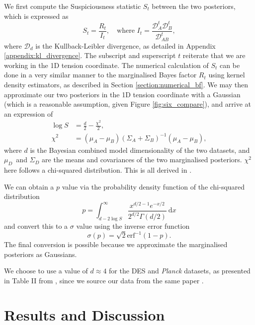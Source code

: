 \documentclass[%
 reprint,
 amsmath,amssymb,
 aps,
]{revtex4-2}
\begin{document}
We first compute the Suspiciousness statistic $S_t$ between the two posteriors, which is expressed as
\begin{equation}
    S_t = \frac{R_t}{I_t}, \quad \textrm{where } I_t = \frac{\mathcal{D}_A^t \mathcal{D}_B^t}{\mathcal{D}_{AB}^t},
\end{equation}
where $\mathcal{D}_d$ is the Kullback-Leibler divergence, as detailed in Appendix \ref{appendix:kl_divergence}.
The subscript and superscript $t$ reiterate that we are working in the 1D tension coordinate. The numerical calculation of $S_t$ can be done in a very similar manner to the marginalised Bayes factor $R_t$ using kernel density estimators, as described in Section \ref{section:numerical_bf}. We may then approximate our two posteriors in the 1D tension coordinate with a Gaussian (which is a reasonable assumption, given Figure \ref{fig:six_compare}), and arrive at an expression of 
\begin{align}
    \log S &= \frac{d}{2} - \frac{\chi^2}{2}, \\
    \chi^2 &= (\mu_A - \mu_B)(\Sigma_A + \Sigma_B)^{-1}(\mu_A - \mu_B),
\end{align}
where $d$ is the Bayesian combined model dimensionality \cite{Handley2019} of the two datasets, and  $\mu_D$\ and $\Sigma_D$ are the means and covariances of the two marginalised posteriors. $\chi^2$ here follows a chi-squared distribution. This is all derived in \cite{Handley2019}.

We can obtain a $p$ value via the probability density function of the chi-squared distribution
\begin{equation}
    p = \int_{d - 2 \log S}^{\infty} \frac{x^{d/2 - 1} e^{-x/2}}{2^{d/2} \Gamma(d/2)} \ \textrm{d} x
\end{equation}
and convert this to a $\sigma$ value using the inverse error function
\begin{equation}
    \sigma (p) = \sqrt{2} \textrm{erf}^{-1} (1 - p).
\end{equation}
The final conversion is possible because we approximate the marginalised posteriors as Gaussians.

We choose to use a value of $d \approx 4$ for the DES and \textit{Planck} datasets, as presented in Table II from \cite{Handley2019}, since we source our data from the same paper \cite{Dataset}.



\section{Results and Discussion}
\end{document}
